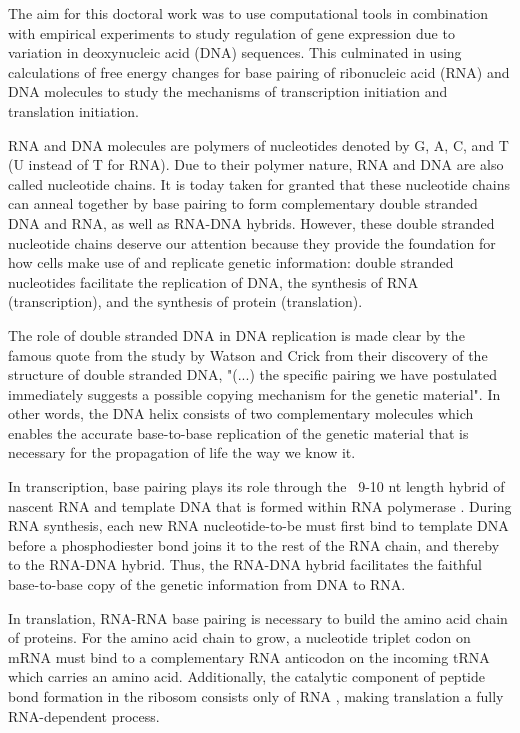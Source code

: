 %
The aim for this doctoral work was to use computational tools in combination
with empirical experiments to study regulation of gene expression due to
variation in deoxynucleic acid (DNA) sequences. This culminated in using
calculations of free energy changes for base pairing of ribonucleic acid (RNA)
and DNA molecules to study the mechanisms of transcription initiation and
translation initiation.

RNA and DNA molecules are polymers of nucleotides denoted by G, A, C, and T (U
instead of T for RNA). Due to their polymer nature, RNA and DNA are also called
nucleotide chains. It is today taken for granted that these nucleotide chains
can anneal together by base pairing to form complementary double stranded DNA
and RNA, as well as RNA-DNA hybrids. However, these double stranded nucleotide
chains deserve our attention because they provide the foundation for how cells
make use of and replicate genetic information: double stranded nucleotides
facilitate the replication of DNA, the synthesis of RNA (transcription), and
the synthesis of protein (translation).

The role of double stranded DNA in DNA replication is made clear by the famous
quote from the study by Watson and Crick \cite{watson_molecular_1953} from
their discovery of the structure of double stranded DNA, "(...) the specific
pairing we have postulated immediately suggests a possible copying mechanism
for the genetic material". In other words, the DNA helix consists of two
complementary molecules which enables the accurate base-to-base replication of
the genetic material that is necessary for the propagation of life the way we
know it.

In transcription, base pairing plays its role through the ~9-10 nt length
hybrid of nascent RNA and template DNA that is formed within RNA polymerase
\cite{vassylyev_structural_2007}. During RNA synthesis, each new RNA
nucleotide-to-be must first bind to template DNA before a phosphodiester bond
joins it to the rest of the RNA chain, and thereby to the RNA-DNA hybrid. Thus,
the RNA-DNA hybrid facilitates the faithful base-to-base copy of the genetic
information from DNA to RNA.

In translation, RNA-RNA base pairing is necessary to build the amino acid chain
of proteins. For the amino acid chain to grow, a nucleotide triplet codon on
mRNA must bind to a complementary RNA anticodon on the incoming tRNA which
carries an amino acid. Additionally, the catalytic component of peptide bond
formation in the ribosom consists only of RNA \cite{steitz_rna_2003}, making
translation a fully RNA-dependent process.

